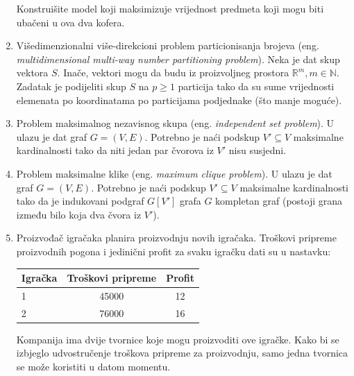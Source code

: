\documentclass[a4paper, utf8, 11pt, colorlinks]{book}
\begin{document}
\begin{enumerate}
\begin{table}[H]
 \end{table}
Konstruišite model koji maksimizuje vrijednost  predmeta koji mogu biti ubačeni u ova dva kofera. 
\item Višedimenzionalni više-direkcioni problem particionisanja brojeva (eng. \emph{multidimensional multi-way number partitioning problem}). Neka je dat skup vektora $S$. Inače, vektori mogu da budu iz proizvoljneg prostora $\mathbb{R}^m, m \in \mathbb{N}$.   Zadatak je podijeliti skup $S$ na $p \geq 1$ particija tako da su sume vrijednosti  elemenata  po koordinatama po particijama podjednake (što manje moguće). 

\item Problem maksimalnog nezavisnog skupa (eng. \emph{independent set problem}). U ulazu je dat graf $G = (V, E)$. Potrebno je naći podskup $V' \subseteq V$ maksimalne kardinalnosti tako da niti jedan par čvorova iz $V'$ nisu susjedni. 
\item Problem maksimalne klike (eng. \emph{maximum clique problem}).   U ulazu je dat graf $G = (V, E)$. Potrebno je naći podskup $V' \subseteq V$ maksimalne kardinalnosti tako da je indukovani podgraf 
$G[V']$ grafa $G$ kompletan graf (postoji grana između bilo koja dva čvora iz $V'$). 
\item %
Proizvođač igračaka planira proizvodnju novih igračaka. Troškovi pripreme proizvodnih pogona i jedinični profit za svaku igračku dati su u nastavku: 
 \begin{table}[H]
	\centering
	\begin{tabular}{l|cc} 
	  \hline
	  Igračka &  Troškovi pripreme    & Profit \\ \hline
	  1       &  45000     &  12     \\
	  2       &  76000     &  16     \\	\hline
	\end{tabular} 
\end{table}
 Kompanija ima dvije tvornice koje mogu proizvoditi ove igračke. Kako bi se izbjeglo udvostručenje troškova pripreme za proizvodnju,  samo jedna tvornica se može koristiti u datom momentu. 
 

\end{enumerate}
\end{document}
